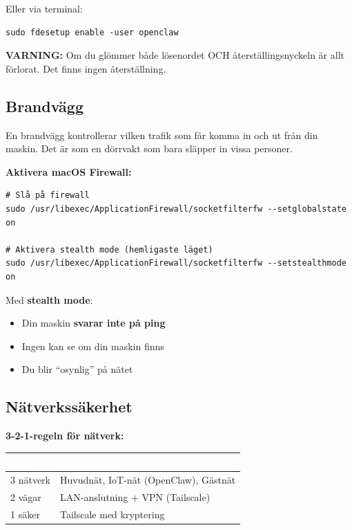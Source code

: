 \documentclass[12pt,a4paper,swedish]{article}
\begin{document}
\bigskip

Eller via terminal:

\begin{lstlisting}[style=latex]
sudo fdesetup enable -user openclaw
\end{lstlisting}

\bigskip

\color{warning}\textbf{VARNING:}\color{black} Om du glömmer både lösenordet OCH återställingsnyckeln är allt förlorat. Det finns ingen återställning.

\subsection{Brandvägg}
\label{sec:brandvagge}

En brandvägg kontrollerar vilken trafik som får komma in och ut från din maskin. Det är som en dörrvakt som bara släpper in vissa personer.

\bigskip

\textbf{Aktivera macOS Firewall:}

\begin{lstlisting}[style=latex]
# Slå på firewall
sudo /usr/libexec/ApplicationFirewall/socketfilterfw --setglobalstate on

# Aktivera stealth mode (hemligaste läget)
sudo /usr/libexec/ApplicationFirewall/socketfilterfw --setstealthmode on
\end{lstlisting}

\bigskip

Med \textbf{stealth mode}:
\begin{itemize}
    \item Din maskin \textbf{svarar inte på ping}
    \item Ingen kan se om din maskin finns
    \item Du blir \enquote{osynlig} på nätet
\end{itemize}

\subsection{Nätverkssäkerhet}
\label{sec:natverk}

\textbf{3-2-1-regeln för nätverk:}

\begin{center}
\begin{tabular}{|p{3cm}|p{10cm}|}
\hline
\rowcolor{primary}
\textcolor{white}{\textbf{Del}} & \textcolor{white}{\textbf{Beskrivning}} \\
\hline
3 nätverk & Huvudnät, IoT-nät (OpenClaw), Gästnät \\
\hline
2 vägar & LAN-anslutning + VPN (Tailscale) \\
\hline
1 säker & Tailscale med kryptering \\
\hline
\end{tabular}
\end{center}
\end{document}
